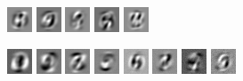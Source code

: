 \documentclass{revtex4-1}
\begin{document}
\begin{figure}
\begin{subfigure}{\linewidth}
    \includegraphics[width=.05\linewidth]{X_l_eigv_7.png}
    \includegraphics[width=.05\linewidth]{X_l_eigv_8.png}
    \includegraphics[width=.05\linewidth]{X_l_eigv_9.png}
    \includegraphics[width=.05\linewidth]{X_l_eigv_10.png}
    \includegraphics[width=.05\linewidth]{X_l_eigv_11.png}
    \caption{}
    \label{fig:modes_data}
  \end{subfigure}
  \begin{subfigure}{\linewidth}
    \includegraphics[width=.05\linewidth]{W_l_eigv_1.png}
    \includegraphics[width=.05\linewidth]{W_l_eigv_2.png}
    \includegraphics[width=.05\linewidth]{W_l_eigv_3.png}
    \includegraphics[width=.05\linewidth]{W_l_eigv_4.png}
    \includegraphics[width=.05\linewidth]{W_l_eigv_5.png}
    \includegraphics[width=.05\linewidth]{W_l_eigv_6.png}
    \includegraphics[width=.05\linewidth]{W_l_eigv_7.png}
    \includegraphics[width=.05\linewidth]{W_l_eigv_8.png}

\end{subfigure}
\end{figure}
\end{document}
